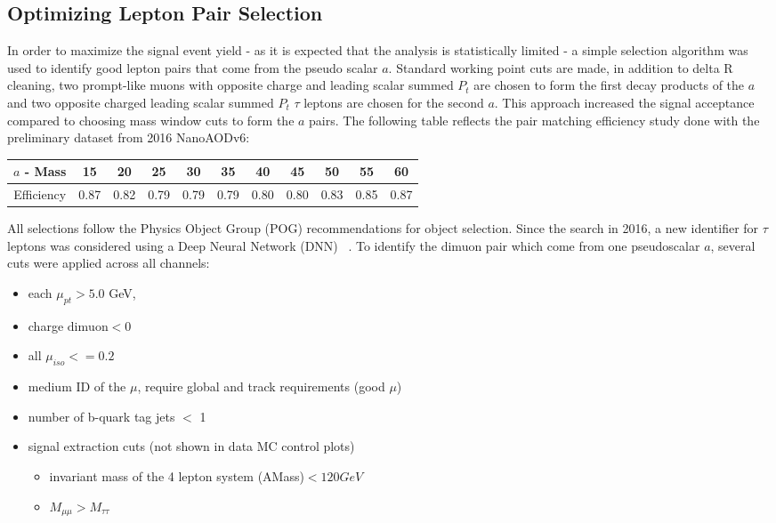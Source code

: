 \subsection{Optimizing Lepton Pair Selection}
\label{sec:selection}
In order to maximize the signal event yield - as it is expected that the analysis is statistically limited - a simple selection algorithm was used to identify good lepton pairs that come from the pseudo scalar $a$. Standard working point cuts are made, in addition to delta R cleaning, two prompt-like muons with opposite charge and leading scalar summed $P_t$ are chosen to form the first decay products of the $a$ and two opposite charged leading scalar summed $P_t$ $\tau$ leptons are chosen for the second $a$. This approach increased the signal acceptance compared to choosing mass window cuts to form the $a$ pairs. The following table reflects the pair matching efficiency study done with the preliminary dataset from 2016 NanoAODv6:
\begin{table}[h]
\begin{center}
    \label{tab:paireff}
\begin{tabular}{|c|c|c|c|c|c|c|c|c|c|c|}\hline
$a$ - Mass & 15     & 20    & 25    & 30    & 35    & 40    & 45    & 50    & 55    & 60 \\\hline
Efficiency & 0.87   & 0.82  &0.79   & 0.79  & 0.79  & 0.80  & 0.80  & 0.83  & 0.85  & 0.87 \\\hline 
\end{tabular}
\end{center}
\end{table}

All selections follow the Physics Object Group (POG) recommendations for object selection.
Since the search in 2016, a new identifier for $\tau$ leptons was considered using a Deep Neural Network (DNN) ~\cite{Hassanshahi:2797703}.
To identify the dimuon pair which come from one pseudoscalar $a$, several cuts were applied across all channels:
\begin{itemize}
    \item each $\mu_{pt} > 5.0$ GeV,
    \item charge $\text{dimuon} < 0$
    \item all $\mu_{iso}<=0.2$
    \item medium ID of the $\mu$, require global and track requirements (good $\mu$)
    \item number of b-quark tag jets $<$ 1 
    \item signal extraction cuts (not shown in data MC control plots)
    \begin{itemize}
    \item invariant mass of the 4 lepton system (AMass)$<120GeV$ 
    \item $M_{\mu\mu} > M_{\tau\tau}$   
    \end{itemize}
\end{itemize}


